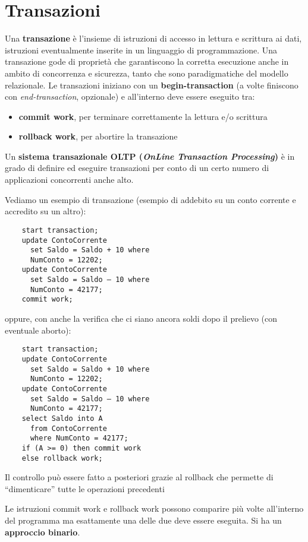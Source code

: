 \documentclass[a4paper,12pt, oneside]{book}
\begin{document}
\section{Transazioni}
Una \textbf{transazione} è l'insieme di istruzioni di accesso in lettura e
scrittura ai dati, istruzioni eventualmente inserite in un linguaggio di
programmazione. Una transazione gode di proprietà che garantiscono la corretta
esecuzione anche in ambito di concorrenza e sicurezza, tanto che sono
paradigmatiche del modello relazionale. Le transazioni iniziano con un
\textbf{begin-transaction} (a volte finiscono con \textit{end-transaction},
opzionale) e all'interno deve essere eseguito tra:
\begin{itemize}
  \item \textbf{commit work}, per terminare correttamente la lettura e/o
  scrittura 
  \item \textbf{rollback work}, per abortire la transazione
\end{itemize}
Un \textbf{sistema transazionale OLTP (\textit{OnLine Transaction Processing})}
è in grado di definire ed eseguire transazioni per conto di un certo numero di
applicazioni concorrenti anche alto. 
\begin{esempio}
  Vediamo un esempio di transazione (esempio di addebito su un conto corrente e
  accredito su un altro):
  \begin{verbatim}
    start transaction;
    update ContoCorrente
      set Saldo = Saldo + 10 where
      NumConto = 12202;
    update ContoCorrente
      set Saldo = Saldo – 10 where
      NumConto = 42177;
    commit work;
  \end{verbatim}
  oppure, con anche la verifica che ci siano ancora soldi dopo il prelievo (con
  eventuale aborto):
  \begin{verbatim}
    start transaction;
    update ContoCorrente
      set Saldo = Saldo + 10 where
      NumConto = 12202;
    update ContoCorrente
      set Saldo = Saldo – 10 where
      NumConto = 42177;
    select Saldo into A
      from ContoCorrente
      where NumConto = 42177;
    if (A >= 0) then commit work
    else rollback work;
  \end{verbatim}
  Il controllo può essere fatto a posteriori grazie al rollback che permette di
  ``dimenticare'' tutte le operazioni precedenti
\end{esempio}
Le istruzioni commit work e rollback work possono comparire più volte
all’interno del programma ma esattamente una delle due deve essere eseguita. Si
ha un \textbf{approccio binario}.\\
\end{document}
